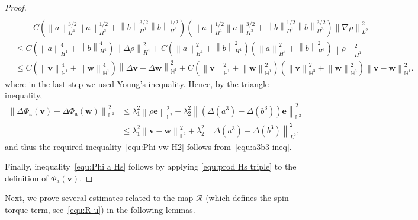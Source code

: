 \documentclass[11pt, reqno]{amsart}
\theoremstyle{definition}
\numberwithin{equation}{section}
\newcommand{\bff}{\boldsymbol}
\newcommand{\bb}{\mathbb}
\newcommand{\norm}[2]{\left\|{#1}\right\|_{#2}}
\begin{document}
\begin{proof}
\begin{align}
    \nonumber \\
    &\quad
    +
    C \left(\norm{a}{H^1}^{3/2} \norm{a}{H^3}^{1/2} + \norm{b}{H^1}^{3/2} \norm{b}{H^3}^{1/2} \right) \left(\norm{a}{H^1}^{1/2} \norm{a}{H^3}^{3/2} + \norm{b}{H^1}^{1/2} \norm{b}{H^3}^{3/2} \right) \norm{\nabla \rho}{L^2}^2
    \nonumber \\
    &\leq
    C\left(\norm{a}{H^1}^4+ \norm{b}{H^1}^4 \right) \norm{\Delta\rho}{H^1}^2 
    +
    C \left(\norm{a}{H^1}^2+ \norm{b}{H^1}^2 \right) \left(\norm{a}{H^3}^2+ \norm{b}{H^3}^2 \right) \norm{\rho}{H^1}^2
    \nonumber \\
    &\leq
    C\left(\norm{\bff{v}}{\bb{H}^1}^4+ \norm{\bff{w}}{\bb{H}^1}^4 \right) \norm{\Delta\bff{v}-\Delta\bff{w}}{\bb{H}^1}^2 
    +
    C \left(\norm{\bff{v}}{\bb{H}^1}^2+ \norm{\bff{w}}{\bb{H}^1}^2 \right) \left(\norm{\bff{v}}{\bb{H}^3}^2+ \norm{\bff{w}}{\bb{H}^3}^2 \right) \norm{\bff{v}-\bff{w}}{\bb{H}^1}^2.
\end{align}
where in the last step we used Young's inequality. Hence, by the triangle inequality,
\begin{align*}
    \norm{\Delta\Phi_{\mathrm{a}}(\bff{v})- \Delta\Phi_{\mathrm{a}}(\bff{w})}{\bb{L}^2}^2
    &\leq
    \lambda_1^2 \norm{\rho\bff{e}}{\bb{L}^2}^2
    +
    \lambda_2^2 \norm{\left(\Delta (a^3)-\Delta(b^3)\right) \bff{e}}{\bb{L}^2}^2
    \\
    &\leq
    \lambda_1^2 \norm{\bff{v}-\bff{w}}{\bb{L}^2}^2 + \lambda_2^2 \norm{\Delta(a^3)-\Delta(b^3)}{L^2}^2,
\end{align*}
and thus the required inequality~\eqref{equ:Phi vw H2} follows from~\eqref{equ:a3b3 ineq}.


Finally, inequality~\eqref{equ:Phi a Hs} follows by applying \eqref{equ:prod Hs triple} to the definition of $\Phi_{\mathrm{a}}(\bff{v})$.
\end{proof}

Next, we prove several estimates related to the map $\mathcal{R}$ (which defines the spin torque term, see~\eqref{equ:R u}) in the following lemmas.
\end{document}
